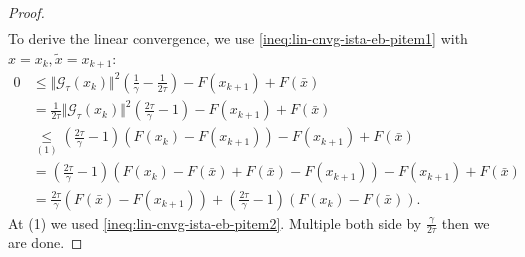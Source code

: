 \documentclass[12pt]{article}
\begin{document}
\begin{proof}
\begin{align}
            \end{align}
            To derive the linear convergence, we use \eqref{ineq:lin-cnvg-ista-eb-pitem1} with $x = x_k, \tilde x = x_{k + 1}$:
            {\allowdisplaybreaks
            \begin{align*}
                0 &\le 
                \Vert \mathcal G_\tau(x_k)\Vert^2\left(
                    \frac{1}{\gamma} - \frac{1}{2\tau} 
                \right)
                - F(x_{k + 1}) + F(\bar x)
                \\
                &= 
                \frac{1}{2\tau}\Vert \mathcal G_\tau(x_k)\Vert^2\left(
                    \frac{2\tau}{\gamma} - 1
                \right)
                - F(x_{k + 1}) + F(\bar x)
                \\
                &\underset{(1)}{\le}
                \left(
                    \frac{2\tau}{\gamma} - 1
                \right)
                \left(
                    F(x_k) - F(x_{k + 1})
                \right)
                - F(x_{k + 1}) + F(\bar x)
                \\
                &= 
                \left(
                    \frac{2\tau}{\gamma} - 1
                \right)
                \left(
                    F(x_k) - F(\bar x) + F(\bar x) - F(x_{k + 1})
                \right)
                - F(x_{k + 1}) + F(\bar x)
                \\
                &= \frac{2\tau}{\gamma}(F(\bar x) - F(x_{k + 1}))
                + \left(
                    \frac{2\tau}{\gamma} - 1
                \right)(F(x_k) - F(\bar x)). 
            \end{align*}
            }
            At (1) we used \eqref{ineq:lin-cnvg-ista-eb-pitem2}. 
            Multiple both side by $\frac{\gamma}{2\tau}$ then we are done. 
        \end{proof}
\end{document}
